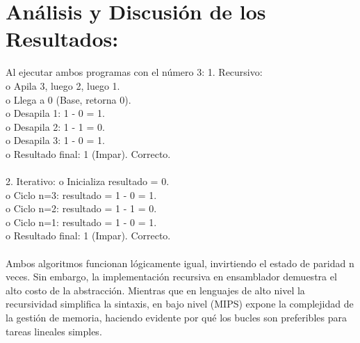 \documentclass{article}
\begin{document}
\section{Análisis y Discusión de los Resultados:}
Al ejecutar ambos programas con el número 3:
1.	Recursivo:
\\
o	Apila 3, luego 2, luego 1.
\\
o	Llega a 0 (Base, retorna 0).
\\
o	Desapila 1: 1 - 0 = 1.
\\
o	Desapila 2: 1 - 1 = 0.
\\
o	Desapila 3: 1 - 0 = 1.
\\
o	Resultado final: 1 (Impar). Correcto.
\\
\\
2.	Iterativo:
o	Inicializa resultado = 0.
\\
o	Ciclo n=3: resultado = 1 - 0 = 1.
\\
o	Ciclo n=2: resultado = 1 - 1 = 0.
\\
o	Ciclo n=1: resultado = 1 - 0 = 1.
\\
o	Resultado final: 1 (Impar). Correcto.
\\
\\
Ambos algoritmos funcionan lógicamente igual, invirtiendo el estado de paridad n veces. Sin embargo, la implementación recursiva en ensamblador demuestra el alto costo de la abstracción. Mientras que en lenguajes de alto nivel la recursividad simplifica la sintaxis, en bajo nivel (MIPS) expone la complejidad de la gestión de memoria, haciendo evidente por qué los bucles son preferibles para tareas lineales simples.
\end{document}
